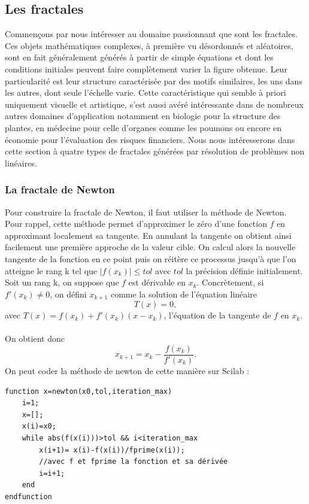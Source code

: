       \subsection{Les fractales}
         Commençons par nous intéresser au domaine passionnant que sont les fractales. Ces objets mathématiques complexes, à première vu désordonnés et aléatoires, sont en fait généralement générés à partir de simple équations et dont les conditions initiales peuvent faire complètement varier la figure obtenue. Leur particularité est leur structure caractérisée par des motifs similaires, les uns dans les autres, dont seule l'échelle varie.
         Cette caractéristique qui semble à priori uniquement visuelle et artistique, s'est aussi avéré intéressante dans de nombreux autres domaines d'application notamment en biologie pour la structure des plantes, en médecine pour celle d'organes comme les poumons ou encore en économie pour l'évaluation des risques financiers. Nous nous intéresserons dans cette section à quatre types de fractales générées par résolution de problèmes non linéaires.
         \subsubsection{La fractale de Newton}
            Pour construire la fractale de Newton, il faut utiliser la méthode de Newton. Pour rappel, cette méthode permet d'approximer le zéro d'une fonction $f$ en approximant localement sa tangente. En annulant la tangente on obtient ainsi facilement une première approche de la valeur cible. On calcul alors la nouvelle tangente de la fonction en ce point puis on réitère ce processus jusqu'à que l'on atteigne le rang k tel que $|f(x_k)|\leq tol$ avec $tol$ la précision définie initialement. 
            \\
            Soit un rang k, on suppose que $f$ est dérivable en $x_k$.
            Concrètement, si $f'(x_k) \neq 0$, on défini $x_{k+1}$ comme la solution de l'équation linéaire $$T(x) = 0,$$ avec $T(x) = f(x_k)+f'(x_k)(x-x_k)$, l'équation de la tangente de $f$ en $x_k$.
            \\
            \\
            On obtient donc
            $$x_{k+1} = x_k - \frac{f(x_k)}{f'(x_k)}.$$
            On peut coder la méthode de newton de cette manière sur Scilab : 

            \begin{center}
                \begin{verbatim}
function x=newton(x0,tol,iteration_max)
    i=1;
    x=[];
    x(i)=x0;
    while abs(f(x(i)))>tol && i<iteration_max
        x(i+1)= x(i)-f(x(i))/fprime(x(i));
        //avec f et fprime la fonction et sa dérivée
        i=i+1;
    end
endfunction
                \end{verbatim}
               \label{lst:code_1}
            \end{center}


